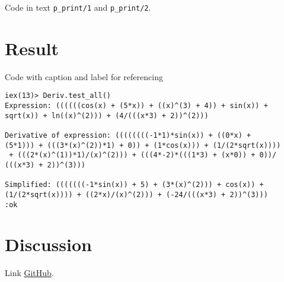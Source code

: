 \documentclass[a4paper,11pt]{article}
\newenvironment{code}{\captionsetup{type=listing}}{}
\begin{document}
Code in text {\tt p\_print/1} and {\tt p\_print/2}.

\section*{Result}
Code with caption and label for referencing
\begin{code}
\label{code:classStructure}
\begin{verbatim}
iex(13)> Deriv.test_all()  
Expression: ((((((cos(x) + (5*x)) + ((x)^(3) + 4)) + sin(x)) + 
sqrt(x)) + ln((x)^(2))) + (4/(((x*3) + 2))^(2)))

Derivative of expression: ((((((((-1*1)*sin(x)) + ((0*x) + 
(5*1))) + (((3*(x)^(2))*1) + 0)) + (1*cos(x))) + (1/(2*sqrt(x))))
 + (((2*(x)^(1))*1)/(x)^(2))) + (((4*-2)*(((1*3) + (x*0)) + 0))/
(((x*3) + 2))^(3)))

Simplified: (((((((-1*sin(x)) + 5) + (3*(x)^(2))) + cos(x)) + 
(1/(2*sqrt(x)))) + ((2*x)/(x)^(2))) + (-24/(((x*3) + 2))^(3)))
:ok
\end{verbatim}
\end{code}


\section*{Discussion}
Link
\href{https://github.com/adrian-jonsson-sjoedin/ID1019-Programming-II/tree/main/Task1_Solution}{GitHub}.
\end{document}
